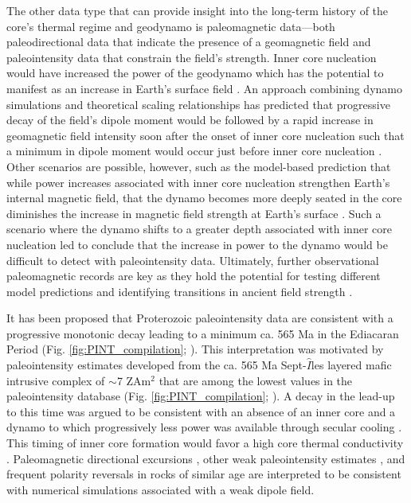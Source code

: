 \documentclass[9pt,twocolumn,twoside,lineno]{pnas-new}
\begin{document}
The other data type that can provide insight into the long-term history of the core's thermal regime and geodynamo is paleomagnetic data---both paleodirectional data that indicate the presence of a geomagnetic field and paleointensity data that constrain the field's strength. Inner core nucleation would have increased the power of the geodynamo which has the potential to manifest as an increase in Earth's surface field \cite{Davies2021a}. An approach combining dynamo simulations and theoretical scaling relationships has predicted that progressive decay of the field's dipole moment would be followed by a rapid increase in geomagnetic field intensity soon after the onset of inner core nucleation such that a minimum in dipole moment would occur just before inner core nucleation \cite{Davies2021a}. Other scenarios are possible, however, such as the model-based prediction that while power increases associated with inner core nucleation strengthen Earth's internal magnetic field, that the dynamo becomes more deeply seated in the core diminishes the increase in magnetic field strength at Earth's surface \cite{Aubert2009a, Landeau2017a}. Such a scenario where the dynamo shifts to a greater depth associated with inner core nucleation led \cite{Aubert2009a} to conclude that the increase in power to the dynamo would be difficult to detect with paleointensity data. Ultimately, further observational paleomagnetic records are key as they hold the potential for testing different model predictions and identifying transitions in ancient field strength \cite{Biggin2015a, Bono2019a}.

It has been proposed that Proterozoic paleointensity data are consistent with a progressive monotonic decay leading to a minimum ca. 565 Ma in the Ediacaran Period (Fig. \ref{fig:PINT_compilation}; \citealp{Bono2019a}). This interpretation was motivated by paleointensity estimates developed from the ca. 565 Ma Sept-$\hat{I}$les layered mafic intrusive complex of $\sim$7 ZAm$^2$ that are among the lowest values in the paleointensity database (Fig. \ref{fig:PINT_compilation}; \citealp{Bono2019a}). A decay in the lead-up to this time was argued to be consistent with an absence of an inner core and a dynamo to which progressively less power was available through secular cooling \cite{Bono2019a, Davies2021a}. This timing of inner core formation would favor a high core thermal conductivity \cite[e.g.][]{Ohta2016a}. Paleomagnetic directional excursions \cite{Halls2015a}, other weak paleointensity estimates \cite{Thallner2021b}, and frequent polarity reversals \cite{Kodama2021a} in rocks of similar age are interpreted to be consistent with numerical simulations \cite{Driscoll2016a} associated with a weak dipole field. 
\end{document}

